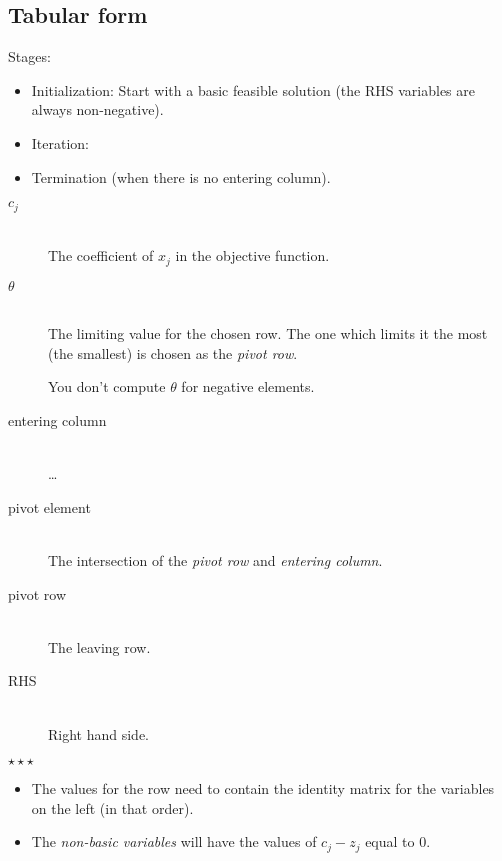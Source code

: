 \documentclass[a4paper, 12pt]{article}
\newcommand*\sepstars{%
  \begin{center}
    $\star\star\star$
  \end{center}
}
\begin{document}
\subsection{Tabular form}

Stages:

\begin{itemize}
    \item Initialization: Start with a basic feasible solution (the RHS
    variables are always non-negative).
    
    \item Iteration:
    
    \item Termination (when there is no entering column).
\end{itemize}

\begin{description}

\item[$c_j$] \hfill \\
    The coefficient of $x_j$ in the objective function.
    
\item[$\theta$] \hfill \\
    The limiting value for the chosen row. The one which limits it the most (the
    smallest) is chosen as the \emph{pivot row}.
    
    You don't compute $\theta$ for negative elements.
    
\item[entering column] \hfill \\
    \ldots
    
\item[pivot element] \hfill \\
    The intersection of the \emph{pivot row} and \emph{entering column}.
    
\item[pivot row] \hfill \\
    The leaving row.

\item[RHS] \hfill \\
    Right hand side.

\end{description}

\sepstars

\begin{itemize}
    \item The values for the row need to contain the identity matrix for the
    variables on the left (in that order).

    \item The \emph{non-basic variables} will have the values of $c_j - z_j$
    equal to 0.
\end{itemize}
\end{document}
